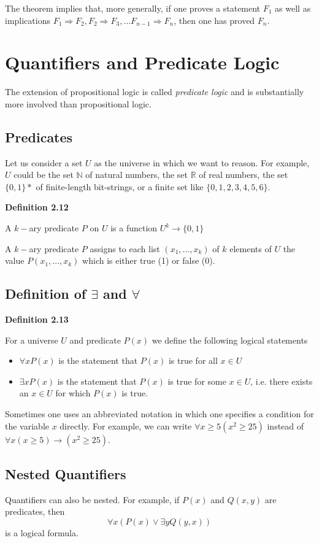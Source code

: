 \documentclass[a4paper]{report}
\newenvironment{definition}[1]{\begin{framed}\centerline{\textbf{Definition #1}}\noindent\hspace{-1.1mm}}{\end{framed}}
\newcommand{\N}{\mathbb{N}}
\newcommand{\R}{\mathbb{R}}
\begin{document}
The theorem implies that, more generally, if one proves a statement $F_1$ as well as implications $F_1\Longrightarrow F_2, F_2\Longrightarrow F_3,\dots F_{n-1}\Longrightarrow F_n$, then one has proved $F_n$.

\section{Quantifiers and Predicate Logic}
The extension of propositional logic is called \emph{predicate logic} and is substantially more involved than propositional logic. 
\subsection{Predicates}
Let us consider a set $U$ as the universe in which we want to reason. For example, $U$ could be the set $\N$ of natural numbers, the set $\R$ of real numbers, the set $\{ 0,1\}*$ of finite-length bit-strings, or a finite set like $\{ 0,1,2,3,4,5,6\}$.

\begin{definition}{2.12}
A $k-$ary predicate $P$ on $U$ is a function $U^k\to\{ 0,1\}$
\end{definition}
A $k-$ary predicate $P$ assigns to each list $( x_1,\dots,x_k)$ of $k$ elements of $U$ the value $P(x_1,\dots, x_k)$ which is either true (1) or false (0).

\subsection{Definition of $\exists$ and $\forall$}
\begin{definition}{2.13}
For a universe $U$ and predicate $P(x)$ we define the following logical statements
\begin{itemize}
\item $\forall x P(x)$ is the statement that $P(x)$ is true for all $x\in U$
\item $\exists x P(x)$ is the statement that $P(x)$ is true for some $x\in U$, i.e. there exists an $x\in U$ for which $P(x)$ is true. 
\end{itemize}
\end{definition}
Sometimes one uses an abbreviated notation in which one specifies a condition for the variable $x$ directly. For example, we can write $\forall x\geq 5(x^2\geq 25)$ instead of $\forall x (x\geq 5)\to (x^2\geq 25)$.

\subsection{Nested Quantifiers}
Quantifiers can also be nested. For example, if $P(x)$ and $Q(x,y)$ are predicates, then \[\forall x(P(x)\lor\exists y  Q(y,x))\] is a logical formula.\\
\end{document}

